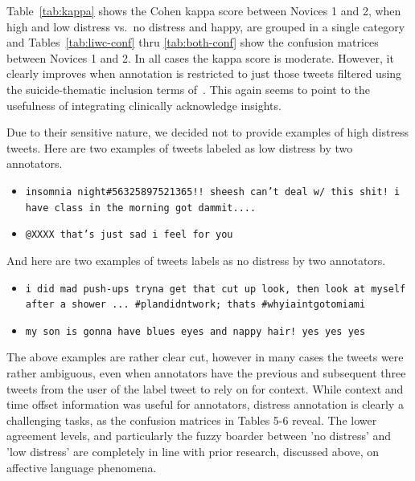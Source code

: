 \documentclass[11pt]{article}
\begin{document}
Table~\ref{tab:kappa} shows the Cohen kappa score between Novices 1 and 2, when high and low distress vs.\ no distress and happy, are grouped in a single category and Tables~\ref{tab:liwc-conf} thru \ref{tab:both-conf} show the confusion matrices between Novices 1 and 2. In all cases the kappa score is moderate. However, it clearly improves when annotation is restricted to just those tweets filtered using the suicide-thematic inclusion terms of~. This again seems to point to the usefulness of integrating clinically acknowledge insights.




Due to their sensitive nature, we decided not to provide examples of high distress tweets. Here are two examples of tweets labeled as low distress by two annotators. 
\begin{itemize}
\footnotesize
\item \texttt{insomnia night\#56325897521365!! sheesh can't deal w/ this shit! i have class in the morning got dammit.... }

\item \texttt{@XXXX that's just sad i feel for you}
\end{itemize}

And here are two examples of tweets labels as no distress by two annotators.

\begin{itemize}
\footnotesize
\item \texttt{i did mad push-ups tryna get that cut up look, then look at myself after a shower ... \#plandidntwork; thats \#whyiaintgotomiami}

\item \texttt{my son is gonna have blues eyes and nappy hair! yes yes yes}
\end{itemize}

The above examples are rather clear cut, however in many cases the tweets were rather ambiguous, even when annotators have the previous and subsequent three tweets from the user of the label tweet to rely on for context. While context and time offset information was useful for annotators, distress annotation is clearly a challenging tasks, as the confusion matrices in Tables 5-6 reveal. The lower agreement levels, and particularly the fuzzy boarder between 'no distress' and 'low distress' are completely in line with prior research, discussed above, on affective language phenomena.
\end{document}

